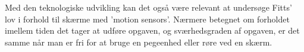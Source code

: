 Med den teknologiske udvikling kan det også være relevant at undersøge Fitts' lov i forhold til skærme med 'motion sensors'. Nærmere betegnet om forholdet imellem tiden det tager at udføre opgaven, og sværhedsgraden af opgaven, er det samme når man er fri for at bruge en pegeenhed eller røre ved en skærm.


\nocite{*}

\printbibliography

